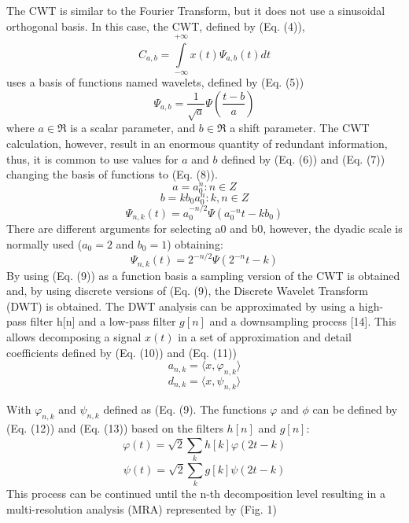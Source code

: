 \documentclass[12pt, a4paper]{article}
\begin{document}
The CWT is similar to the Fourier Transform, but it does not use a sinusoidal orthogonal basis. In this case, the CWT, defined by (Eq. (4)), 
\begin{equation}
C_{a,b} = \int\limits_{-\infty}^{+\infty} x(t) \Psi_{a,b}(t) dt
\end{equation}
uses a basis of functions named wavelets, defined by (Eq. (5)) 
\begin{equation}
\Psi_{a,b} = \frac{1}{\sqrt{a}} \Psi(\frac{t-b}{a})
\end{equation}
where $ a \in \Re $ is a scalar parameter, and $ b \in \Re $ a shift parameter. The CWT calculation, however, result in an enormous quantity of redundant information, thus, it is common to use values for $a$ and $b$ defined by (Eq. (6)) and (Eq. (7)) changing the basis of functions to (Eq. (8)).
\begin{equation}
a = a_{0}^{n} : n \in Z
\end{equation}
\begin{equation}
b = k b_{0} a_{0}^{n} : k, n \in Z
\end{equation}
\begin{equation}
\Psi_{n, k}(t) = a_{0}^{-n/2} \Psi(a_{0}^{-n} t - k b_0)
\end{equation}
There are different arguments for selecting a0 and b0, however, the dyadic scale is normally used ($a_0=2$ and $b_0=1$) obtaining:
\begin{equation}
\Psi_{n, k}(t) = 2^{-n/2} \Psi(2^{-n}t-k)
\end{equation}
By using (Eq. (9)) as a function basis a sampling version of the CWT is obtained and, by using discrete versions of (Eq. (9), the Discrete Wavelet Transform (DWT) is obtained.  The DWT analysis can be approximated by using a high-pass filter h[n] and a low-pass filter $g[n]$ and a downsampling process [14]. This allows decomposing a signal $x(t)$ in a set of approximation and detail coefficients defined by (Eq. (10)) and (Eq. (11))
\begin{equation}
a_{n,k} = \langle x, \varphi_{n,k} \rangle
\end{equation}
\begin{equation}
d_{n,k} = \langle x, \psi_{n,k} \rangle
\end{equation}

With $ \varphi_{n,k} $ and $ \psi_{n,k} $ defined as (Eq. (9). The functions $\varphi$ and $\phi$ can be defined by (Eq. (12)) and (Eq. (13)) based on the filters $h[n]$ and $g[n]$:
\begin{equation}
\varphi(t) = \sqrt{2} \sum\limits_{k}^{} h[k] \varphi(2t-k)
\end{equation}
\begin{equation}
\psi(t) = \sqrt{2} \sum\limits_{k}^{} g[k] \psi(2t-k)
\end{equation}
This process can be continued until the n-th decomposition level resulting in a multi-resolution analysis (MRA) represented by (Fig. 1) 
\end{document}
